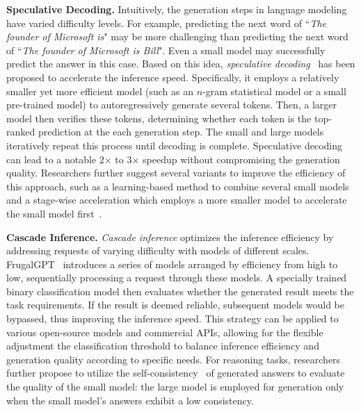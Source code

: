 \textbf{Speculative Decoding.} Intuitively, the generation steps in language modeling have varied difficulty levels. For example, predicting the next word of ``\emph{The founder of Microsoft is}" may be more challenging than predicting the next word of ``\emph{The founder of Microsoft is Bill}". Even a small model may successfully predict the answer in this case. Based on this idea, \emph{speculative decoding}~\cite{Yaniv-ICML-2023-Fast,Chen-arxiv-2023-Accelerating} has been proposed to accelerate the inference speed. Specifically, it employs a relatively smaller yet more efficient model (such as an $n$-gram statistical model or a small pre-trained model) to autoregressively generate several tokens. Then, a larger model then verifies these tokens, determining {whether each token is the top-ranked prediction at the each generation step}. The small and large models iteratively repeat this process until decoding is complete. Speculative decoding can lead to a notable 2$\times$ to 3$\times$ speedup without compromising the generation quality. Researchers further suggest several variants to improve the efficiency of this approach, such as a learning-based method to combine several small models~\cite{Miao-arxiv-2023-SpecInfer} and a stage-wise acceleration which employs a more smaller model to accelerate the small model first~\cite{Spector-2023-arxiv-Accelerating}.

\textbf{Cascade Inference.}
{\emph{Cascade inference} optimizes the inference efficiency by addressing requests of varying difficulty with models of different scales.} FrugalGPT~\cite{Chen-arxiv-2023-frugalgpt} introduces a series of models arranged by efficiency from high to low, sequentially processing a request through these models. A specially trained binary classification model then evaluates whether the generated result meets the task requirements. If the result is deemed reliable, subsequent models would be bypassed, thus improving the inference speed. This strategy can be applied to various open-source models and commercial APIs, allowing for the flexible adjustment the classification threshold to balance inference efficiency and generation quality according to specific needs. For reasoning tasks, researchers~\cite{Yue-arxiv-2023-large} further propose to utilize the self-consistency~\cite{Wang-arxiv-2022-Self-Consistency} of generated answers to evaluate the quality of the small model: the large model is employed for generation only when the small model's answers exhibit a low consistency. 

